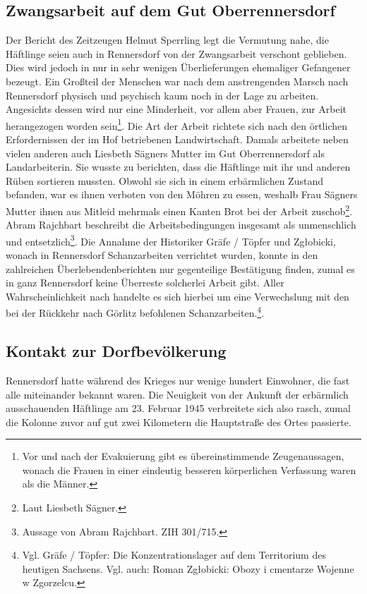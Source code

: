 \documentclass[a4paper,12pt,ngerman,
]{nisebook}
\begin{document}
\subsection{Zwangsarbeit auf dem Gut Oberrennersdorf}
Der Bericht des Zeitzeugen Helmut Sperrling legt die Vermutung nahe, die Häftlinge seien auch in Rennersdorf von der Zwangsarbeit verschont geblieben. Dies wird jedoch in nur in sehr wenigen Überlieferungen ehemaliger Gefangener bezeugt. Ein Großteil der Menschen war nach dem anstrengenden Marsch nach Rennersdorf physisch und psychisch kaum noch in der Lage zu arbeiten. Angesichts dessen wird nur eine Minderheit, vor allem aber Frauen, zur Arbeit herangezogen worden sein\footnote{Vor und nach der Evakuierung gibt es übereinstimmende Zeugenaussagen, wonach die Frauen in einer eindeutig besseren körperlichen Verfassung waren als die Männer.}.
Die Art der Arbeit richtete sich nach den örtlichen Erfordernissen der im Hof betriebenen Landwirtschaft.
Damals arbeitete neben vielen anderen auch Liesbeth Sägners Mutter im Gut Oberrennersdorf als Landarbeiterin. Sie wusste zu berichten, dass die Häftlinge mit ihr und anderen Rüben sortieren mussten. Obwohl sie sich in einem erbärmlichen Zustand befanden, war es ihnen verboten von den Möhren zu essen, weshalb Frau Sägners Mutter ihnen aus Mitleid mehrmals einen Kanten Brot bei der Arbeit zuschob\footnote{Laut Liesbeth Sägner.}. 
Abram Rajchbart beschreibt die Arbeitsbedingungen insgesamt als unmenschlich und entsetzlich\footnote{Aussage von Abram Rajchbart. ZIH 301/715.}. Die Annahme der Historiker Gräfe / Töpfer und Zg\l obicki, wonach in Rennersdorf Schanzarbeiten verrichtet wurden, konnte in den zahlreichen Überlebendenberichten nur gegenteilige Bestätigung finden, zumal es in ganz Rennersdorf keine Überreste solcherlei Arbeit gibt. Aller Wahrscheinlichkeit nach handelte es sich hierbei um eine Verwechslung mit den bei der Rückkehr nach Görlitz befohlenen Schanzarbeiten.\footnote{Vgl. Gräfe / Töpfer: Die Konzentrationslager auf dem Territorium des heutigen Sachsens. Vgl. auch: Roman Zg\l obicki: Obozy i cmentarze Wojenne w Zgorzelcu.}. 




\subsection{Kontakt zur Dorfbevölkerung}
Rennersdorf hatte während des Krieges nur wenige hundert Einwohner, die fast alle miteinander bekannt waren. Die Neuigkeit von der Ankunft der erbärmlich ausschauenden Häftlinge am 23. Februar 1945 verbreitete sich also rasch, zumal die Kolonne zuvor auf gut zwei Kilometern die Hauptstraße des Ortes passierte. 
\end{document}
